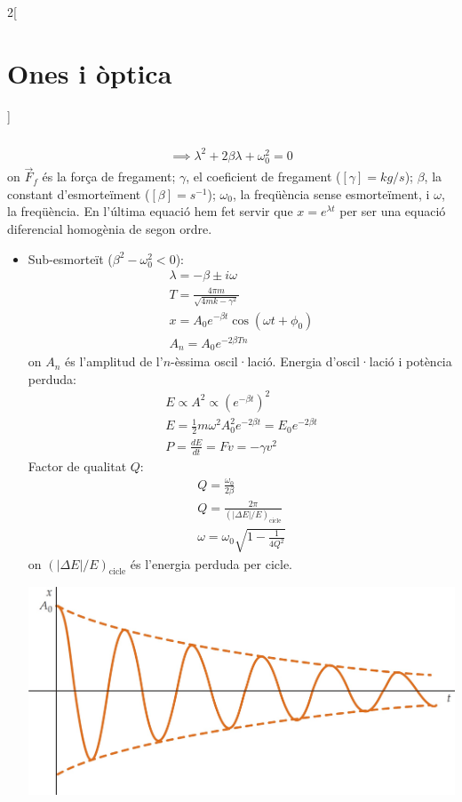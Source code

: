 \documentclass[class=article,10pt,crop=false]{standalone}
\begin{document}
\begin{multicols}{2}[\section{Ones i òptica}]
\begin{gather*}
\begin{multlined}
    \end{multlined}\\
    \implies\lambda^2+2\beta\lambda+\omega_0^2=0
\end{gather*}
{\footnotesize on $\Vec{F}_f$ és la força de fregament; $\gamma$, el coeficient de fregament ($[\gamma]=kg/s$); $\beta$, la constant d'esmorteïment ($[\beta]=s^{-1}$); $\omega_0$, la freqüència sense esmorteïment, i $\omega$, la freqüència. En l'última equació hem fet servir que $x=e^{\lambda t}$ per ser una equació diferencial homogènia de segon ordre.}
\begin{itemize}
    \item Sub-esmorteït ($\beta^2-\omega_0^2<0$):
    \begin{gather*}
        \lambda=-\beta\pm i\omega\\
        T=\frac{4\pi m}{\sqrt{4mk-\gamma^2}}\\
        x=A_0e^{-\beta t}\cos(\omega t+\phi_0)\\
        A_n=A_0e^{-2\beta Tn}
    \end{gather*} {\footnotesize on $A_n$ és l'amplitud de l'$n$-èssima oscil·lació.}\newline
    Energia d'oscil·lació i potència perduda:
    \begin{gather*}
        E\propto A^2\propto (e^{-\beta t})^2\\
        E=\frac{1}{2}m\omega^2A_0^2e^{-2\beta t}=E_0e^{-2\beta t}\\
        P=\frac{dE}{dt}=Fv=-\gamma v^2
    \end{gather*}
    Factor de qualitat $Q$:
    \begin{gather*}
        Q=\frac{\omega_0}{2\beta}\\
        Q=\frac{2\pi}{(|\Delta E|/E)_{\text{cicle}}}\\
        \omega=\omega_0\sqrt{1-\frac{1}{4Q^2}}
    \end{gather*} {\footnotesize on $(|\Delta E|/E)_{\text{cicle}}$ és l'energia perduda per cicle.}\newline
    \begin{minipage}{\linewidth}
       \centering
       \includegraphics[width=\linewidth]{Physics/1st/Waves_and_optics/Images/udamp.jpg}

\end{minipage}
\end{itemize}
\end{multicols}
\end{document}
